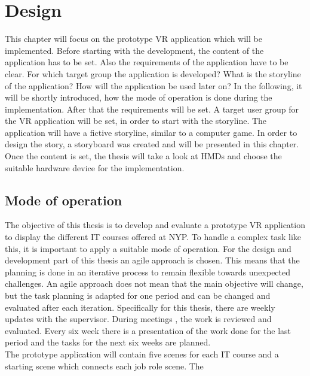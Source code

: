 \chapter{Design}
This chapter will focus on the prototype VR application which will be implemented. Before starting with the development, the content of the  application has to be set. Also the requirements of the application have to be clear. For which target group the application is developed? What is the storyline of the application? How will the application be used later on? In the following, it will be shortly introduced, how the mode of operation is done during the implementation. After that the requirements will be set. A target user group for the VR application will be set, in order to start with the storyline. The application will have a fictive storyline, similar to a computer game. In order to design the story, a storyboard was created and will be presented in this chapter. Once the content is set, the thesis will take a look at HMDs and choose the suitable hardware device for the implementation.
\section{Mode of operation}
The objective of this thesis is to develop and evaluate a prototype VR application to display the different IT courses offered at NYP. To handle a complex task like this, it is important to apply a suitable mode of operation. For the design and development part of this thesis an agile approach is chosen. This means that the planning is done in an iterative process to remain flexible towards unexpected challenges. An agile approach does not mean that the main objective will change, but the task planning is adapted for one period and can be changed and evaluated after each iteration. Specifically for this thesis, there are weekly updates with the supervisor. During meetings , the work is reviewed and evaluated. Every six week there is a presentation of the work done for the last period and the tasks for the next six weeks are planned. \\
The prototype application will contain five scenes for each IT course and a starting scene which connects each job role scene. The 

